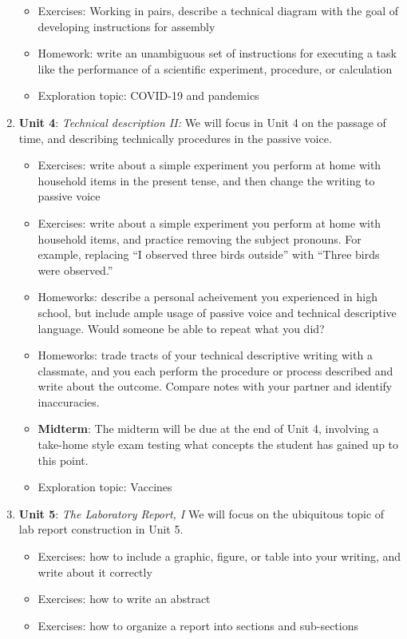 \documentclass[10pt]{article}
\begin{document}
\begin{enumerate}
\begin{itemize}
\item Exercises: Working in pairs, describe a technical diagram with the goal of developing instructions for assembly
\item Homework: write an unambiguous set of instructions for executing a task like the performance of a scientific experiment, procedure, or calculation
\item Exploration topic: COVID-19 and pandemics
\end{itemize}
\item \textbf{Unit 4}: \textit{Technical description II:} We will focus in Unit 4 on the passage of time, and describing technically procedures in the passive voice.
\begin{itemize}
\item Exercises: write about a simple experiment you perform at home with household items in the present tense, and then change the writing to passive voice
\item Exercises: write about a simple experiment you perform at home with household items, and practice removing the subject pronouns.  For example, replacing ``I observed three birds outside'' with ``Three birds were observed.''
\item Homeworks: describe a personal acheivement you experienced in high school, but include ample usage of passive voice and technical descriptive language.  Would someone be able to repeat what you did?
\item Homeworks: trade tracts of your technical descriptive writing with a classmate, and you each perform the procedure or process described and write about the outcome.  Compare notes with your partner and identify inaccuracies.
\item \textbf{Midterm}: The midterm will be due at the end of Unit 4, involving a take-home style exam testing what concepts the student has gained up to this point.
\item Exploration topic: Vaccines
\end{itemize}
\item \textbf{Unit 5}: \textit{The Laboratory Report, I} We will focus on the ubiquitous topic of lab report construction in Unit 5.
\begin{itemize}
\item Exercises: how to include a graphic, figure, or table into your writing, and write about it correctly
\item Exercises: how to write an abstract
\item Exercises: how to organize a report into sections and sub-sections

\end{itemize}
\end{enumerate}
\end{document}

